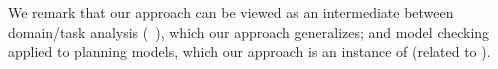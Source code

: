 We remark that our approach can be viewed as an intermediate between
domain/task analysis (\eg\ \cite{fox:long:jair-98}), which our
approach generalizes; and model checking applied to planning models,
which our approach is an instance of (related to
\cite{vaquero:etal:keq-13}). 
%
%

